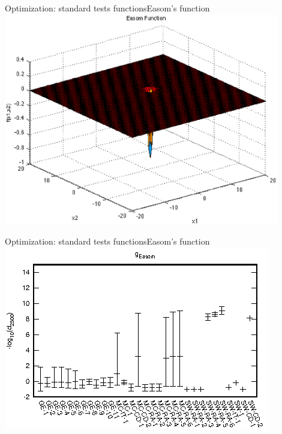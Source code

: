 \documentclass[10pt]{beamer}
\begin{document}
\begin{frame}{Optimization: standard tests functions}{Easom's function}
	\includegraphics[width=0.9\textwidth]{easom-function.eps}
\end{frame}

\begin{frame}{Optimization: standard tests functions}{Easom's function}
	\includegraphics[width=\textwidth]{Easom-e.eps}
\end{frame}
\end{document}
